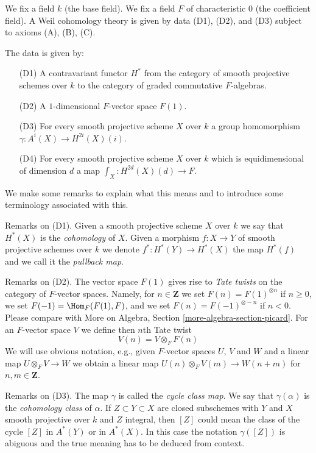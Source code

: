 \medskip\noindent
We fix a field $k$ (the base field).
We fix a field $F$ of characteristic $0$ (the coefficient field).
A Weil cohomology theory is given by data (D1), (D2), and (D3)
subject to axioms (A), (B), (C).

\medskip\noindent
The data is given by:
\begin{enumerate}
\item[(D1)] A contravariant functor $H^*$ from the category
of smooth projective schemes over $k$ to the category of
graded commutative $F$-algebras.
\item[(D2)] A $1$-dimensional $F$-vector space $F(1)$.
\item[(D3)] For every smooth projective scheme $X$ over $k$
a group homomorphism $\gamma : A^i(X) \to H^{2i}(X)(i)$.
\item[(D4)] For every smooth projective scheme $X$ over $k$
which is equidimensional of dimension $d$ a map
$\int_X : H^{2d}(X)(d) \to F$.
\end{enumerate}
We make some remarks to explain what this means and to introduce
some terminology associated with this.

\medskip\noindent
Remarks on (D1).
Given a smooth projective scheme $X$ over $k$ we say that $H^*(X)$
is the {\it cohomology} of $X$. Given a morphism $f : X \to Y$
of smooth projective schemes over $k$ we denote $f^* : H^*(Y) \to H^*(X)$
the map $H^*(f)$ and we call it the {\it pullback map}.

\medskip\noindent
Remarks on (D2).
The vector space $F(1)$ gives rise to {\it Tate twists} on the category of
$F$-vector spaces. Namely, for $n \in \mathbf{Z}$ we set
$F(n) = F(1)^{\otimes n}$ if $n \geq 0$, we set $F(-1) = \Hom_F(F(1), F)$,
and we set $F(n) = F(-1)^{\otimes - n}$ if $n < 0$. Please compare
with More on Algebra, Section \ref{more-algebra-section-picard}.
For an $F$-vector space $V$ we define then $n$th Tate twist
$$
V(n) = V \otimes_F F(n)
$$
We will use obvious notation, e.g., given $F$-vector spaces $U$, $V$
and $W$ and a linear map $U \otimes_F V \to W$ we obtain a linear
map $U(n) \otimes_F V(m) \to W(n + m)$ for $n, m \in \mathbf{Z}$.

\medskip\noindent
Remarks on (D3). The map $\gamma$ is called the {\it cycle class map}.
We say that $\gamma(\alpha)$ is the {\it cohomology class} of $\alpha$.
If $Z \subset Y \subset X$ are closed subschemes with $Y$ and $X$
smooth projective over $k$ and $Z$ integral, then $[Z]$ could
mean the class of the cycle $[Z]$ in $A^*(Y)$ or in $A^*(X)$.
In this case the notation $\gamma([Z])$ is abiguous and the true meaning
has to be deduced from context.

